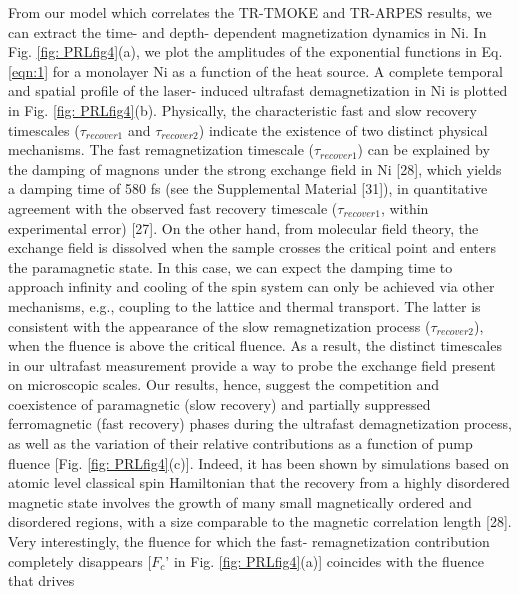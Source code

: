 From our model which correlates the TR-TMOKE and TR-ARPES results, we can extract the time- and depth- dependent magnetization dynamics in Ni. In Fig. \ref{fig: PRLfig4}(a), we plot the amplitudes of the exponential functions in Eq. \ref{eqn:1} for a monolayer Ni as a function of the heat source. A complete temporal and spatial profile of the laser- induced ultrafast demagnetization in Ni is plotted in Fig. \ref{fig: PRLfig4}(b). Physically, the characteristic fast and slow recovery timescales ($\tau_{recover1}$ and $\tau_{recover2}$) indicate the existence of two distinct physical mechanisms. The fast remagnetization timescale ($\tau_{recover1}$) can be explained by the damping of magnons under the strong exchange field in Ni [28], which yields a damping time of 580 fs (see the Supplemental Material [31]), in quantitative agreement with the observed fast recovery timescale ($\tau_{recover1}$, within experimental error) [27]. On the other hand, from molecular field theory, the exchange field is dissolved when the sample crosses the critical point and enters the paramagnetic state. In this case, we can expect the damping time to approach infinity and cooling of the spin system can only be achieved via other mechanisms, e.g., coupling to the lattice and thermal transport. The latter is consistent with the appearance of the slow remagnetization process ($\tau_{recover2}$), when the fluence is above the critical fluence. As a result, the distinct timescales in our ultrafast measurement provide a way to probe the exchange field present on microscopic scales. Our results, hence, suggest the competition and coexistence of paramagnetic (slow recovery) and partially suppressed ferromagnetic (fast recovery) phases during the ultrafast demagnetization process, as well as the variation of their relative contributions as a function of pump fluence [Fig. \ref{fig: PRLfig4}(c)]. Indeed, it has been shown by simulations based on atomic level classical spin Hamiltonian that the recovery from a highly disordered
magnetic state involves the growth of many small magnetically ordered and disordered regions, with a size comparable to the magnetic correlation length [28]. Very interestingly, the fluence for which the fast- remagnetization contribution completely disappears [$F_c$' in Fig. \ref{fig: PRLfig4}(a)] coincides with the fluence that drives
